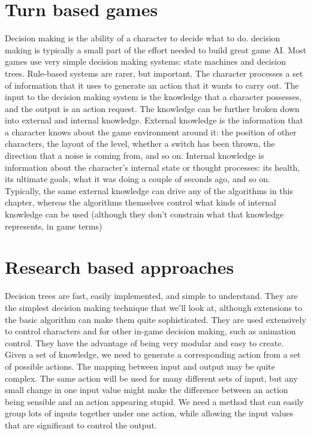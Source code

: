 \section{Turn based games}
Decision making is the ability of a character to decide what to do.
decision making is typically a small part of the effort needed to build great game
AI. Most games use very simple decision making systems: state machines and decision trees.
Rule-based systems are rarer, but important.
The character processes a set of information that it uses to generate an action that it wants to
carry out. The input to the decision making system is the knowledge that a character possesses,
and the output is an action request. The knowledge can be further broken down into external
and internal knowledge. External knowledge is the information that a character knows about the
game environment around it: the position of other characters, the layout of the level, whether a
switch has been thrown, the direction that a noise is coming from, and so on. Internal knowledge
is information about the character’s internal state or thought processes: its health, its ultimate
goals, what it was doing a couple of seconds ago, and so on.
Typically, the same external knowledge can drive any of the algorithms in this chapter, whereas
the algorithms themselves control what kinds of internal knowledge can be used (although they
don’t constrain what that knowledge represents, in game terms)
\section{Research based approaches}
Decision trees are fast, easily implemented, and simple to understand. They are the simplest
decision making technique that we’ll look at, although extensions to the basic algorithm can make
them quite sophisticated. They are used extensively to control characters and for other in-game
decision making, such as animation control.
They have the advantage of being very modular and easy to create.
Given a set of knowledge, we need to generate a corresponding action from a set of possible
actions.
The mapping between input and output may be quite complex. The same action will be used
for many different sets of input, but any small change in one input value might make the difference
between an action being sensible and an action appearing stupid.
We need a method that can easily group lots of inputs together under one action, while
allowing the input values that are significant to control the output.